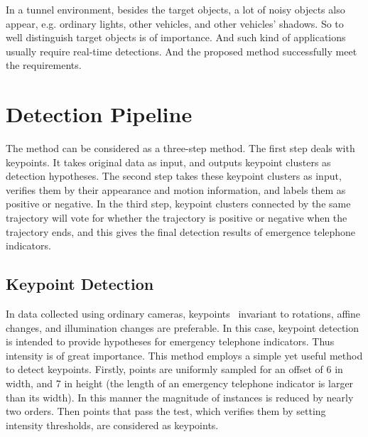  In a tunnel environment, besides the target objects, a lot of noisy objects also appear, e.g. ordinary lights, other vehicles, and other vehicles' shadows. So to well distinguish target objects is of importance. And such kind of applications usually require real-time detections. And the proposed method successfully meet the requirements.

\section{Detection Pipeline}
\label{pip}
The method can be considered as a three-step method. The first step deals with keypoints. It
takes original data as input, and outputs keypoint clusters as detection hypotheses. The second
step takes these keypoint clusters as input, verifies them by their appearance and motion
information, and labels them as positive or negative. In the third step, keypoint clusters connected by the same trajectory will vote for whether the trajectory is positive or negative when the trajectory ends, and this gives the final detection results of emergence telephone indicators.

\subsection{Keypoint Detection}

In data collected using ordinary cameras, keypoints~\citep{o2,o12} invariant to rotations, affine changes, and illumination changes are preferable. In this case, keypoint detection is intended to provide hypotheses for emergency telephone indicators. Thus intensity is of great importance. This method employs a simple yet useful method to detect keypoints. Firstly, points are uniformly sampled for an offset of 6 in width, and 7 in height (the length of an emergency telephone indicator is larger than its width). In this manner the magnitude of instances is reduced by nearly two orders. Then points that pass the test, which verifies them by setting intensity thresholds, are considered as keypoints.

